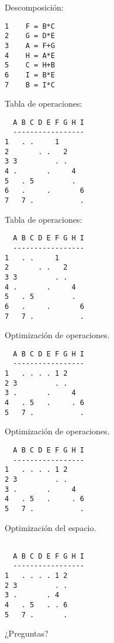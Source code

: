\documentclass{beamer}
\begin{document}
\begin{frame}[fragile]
Descomposición:
\begin{lstlisting}
1    F = B*C
2    G = D*E
3    A = F+G
4    H = A*E
5    C = H+B
6    I = B*E
7    B = I*C
\end{lstlisting}
Tabla de operaciones:
\begin{lstlisting}
  A B C D E F G H I
  -----------------
1   . .     1      
2       . .   2        
3 3         . .        
4 .       .     4     
5   . 5         .
6   .     .       6
7   7 .           .
\end{lstlisting}
\end{frame}



\begin{frame}[fragile]
Tabla de operaciones:
\begin{lstlisting}
  A B C D E F G H I
  -----------------
1   . .     1      
2       . .   2        
3 3         . .        
4 .       .     4     
5   . 5         .
6   .     .       6
7   7 .           .
\end{lstlisting}
Optimización de operaciones.
\begin{lstlisting}
  A B C D E F G H I
  -----------------
1   . . . . 1 2    
2 3         . .       
3 .       .     4    
4   . 5   .     . 6
5   7 .           .
\end{lstlisting}
\end{frame}



\begin{frame}[fragile]
Optimización de operaciones.
\begin{lstlisting}
  A B C D E F G H I
  -----------------
1   . . . . 1 2    
2 3         . .       
3 .       .     4    
4   . 5   .     . 6
5   7 .           .
\end{lstlisting}
Optimización del espacio.
\begin{lstlisting}

  A B C D E F G H I
  -----------------
1   . . . . 1 2    
2 3         . .    
3 .       . 4      
4   . 5   . . 6    
5   7 .       .    
\end{lstlisting}
\end{frame}



\begin{frame}

\end{frame}



\begin{frame}
\center ¿Preguntas?
\end{frame}
\end{document}
